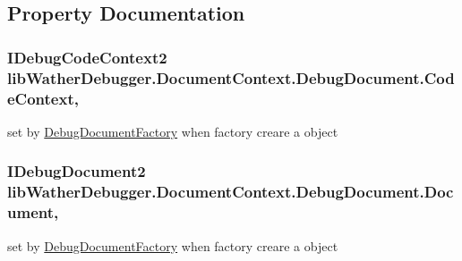 \subsection{Property Documentation}
\hypertarget{classlib_wather_debugger_1_1_document_context_1_1_debug_document_ae0ef452be2b8d2172dc400609a334386}{
\subsubsection[{Code\+Context}]{\setlength{\rightskip}{0pt plus 5cm}I\+Debug\+Code\+Context2 lib\+Wather\+Debugger.\+Document\+Context.\+Debug\+Document.\+Code\+Context\hspace{0.3cm}{\ttfamily [get]}, {\ttfamily [set]}}}\label{classlib_wather_debugger_1_1_document_context_1_1_debug_document_ae0ef452be2b8d2172dc400609a334386}


set by \hyperlink{classlib_wather_debugger_1_1_document_context_1_1_debug_document_factory}{Debug\+Document\+Factory} when factory creare a object 

\hypertarget{classlib_wather_debugger_1_1_document_context_1_1_debug_document_a060cec73f6364f7c4206c4f557c64a18}{
\subsubsection[{Document}]{\setlength{\rightskip}{0pt plus 5cm}I\+Debug\+Document2 lib\+Wather\+Debugger.\+Document\+Context.\+Debug\+Document.\+Document\hspace{0.3cm}{\ttfamily [get]}, {\ttfamily [set]}}}\label{classlib_wather_debugger_1_1_document_context_1_1_debug_document_a060cec73f6364f7c4206c4f557c64a18}


set by \hyperlink{classlib_wather_debugger_1_1_document_context_1_1_debug_document_factory}{Debug\+Document\+Factory} when factory creare a object 

